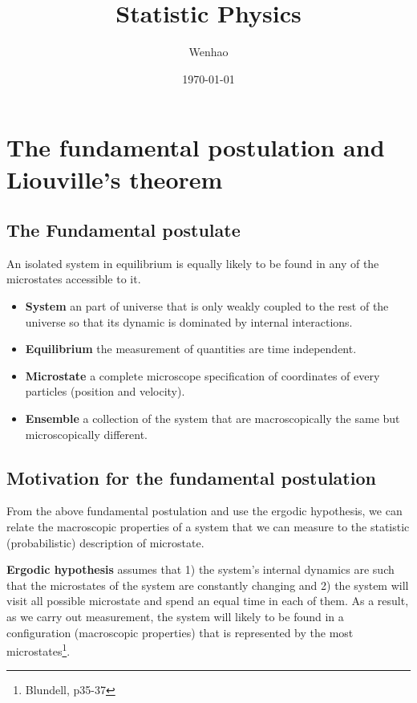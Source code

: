 \documentclass{article}
\begin{document}
\title{Statistic Physics}
\author{Wenhao}
\date{\today}
\maketitle

\section{The fundamental postulation and Liouville's theorem}

\subsection{The Fundamental postulate}
An isolated system in equilibrium is equally likely to be found in any
of the microstates accessible to it.

\begin{itemize}
    \item \textbf{System} an part of universe that is only weakly coupled to the rest of the universe 
    so that its dynamic is dominated by internal interactions.
    \item \textbf{Equilibrium} the measurement of quantities are time independent.
    \item \textbf{Microstate} a complete microscope specification of coordinates of every particles (position and velocity).
    \item \textbf{Ensemble} a collection of the system that are macroscopically the same but microscopically different. 
\end{itemize}

\subsection{Motivation for the fundamental postulation}
From the above fundamental postulation and use the ergodic hypothesis, we can relate the macroscopic properties of a system that we can measure 
to the statistic (probabilistic) description of microstate. 

\textbf{Ergodic hypothesis} assumes that 1) the system's internal dynamics are such that the microstates of the system are 
constantly changing and 2) the system will visit all possible microstate and spend an equal time in each of them. 
As a result, as we carry out measurement, the system will likely to be found in a configuration (macroscopic properties) that 
is represented by the most microstates\footnote{Blundell, p35-37}. 
\end{document}
